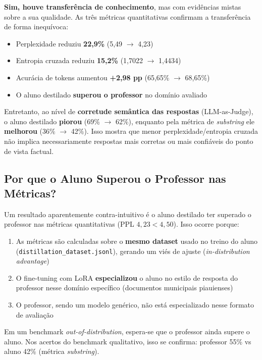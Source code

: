 \documentclass[12pt, a4paper]{article}
\begin{document}
\begin{destaquebox}
\textbf{Sim, houve transferência de conhecimento}, mas com evidências mistas sobre a
sua qualidade. As três métricas quantitativas confirmam a transferência de forma
inequívoca:
\begin{itemize}
  \item Perplexidade reduziu \textbf{22,9\%} (5,49 $\rightarrow$ 4,23)
  \item Entropia cruzada reduziu \textbf{15,2\%} (1,7022 $\rightarrow$ 1,4434)
  \item Acurácia de tokens aumentou \textbf{+2,98 pp} (65,65\% $\rightarrow$ 68,65\%)
  \item O aluno destilado \textbf{superou o professor} no domínio avaliado
\end{itemize}
Entretanto, ao nível de \textbf{corretude semântica das respostas} (LLM-as-Judge), o
aluno destilado \textbf{piorou} (69\% $\rightarrow$ 62\%), enquanto pela métrica de
\textit{substring} ele \textbf{melhorou} (36\% $\rightarrow$ 42\%). Isso mostra que
menor perplexidade/entropia cruzada não implica necessariamente respostas mais
corretas ou mais confiáveis do ponto de vista factual.
\end{destaquebox}

\subsection{Por que o Aluno Superou o Professor nas Métricas?}

Um resultado aparentemente contra-intuitivo é o aluno destilado ter superado o
professor nas métricas quantitativas (PPL $4{,}23 < 4{,}50$). Isso ocorre porque:

\begin{enumerate}
  \item As métricas são calculadas sobre o \textbf{mesmo dataset} usado no treino
        do aluno (\texttt{distillation\_dataset.jsonl}), gerando um viés de ajuste
        (\textit{in-distribution advantage})
  \item O fine-tuning com LoRA \textbf{especializou} o aluno no estilo de resposta
        do professor nesse domínio específico (documentos municipais piauienses)
  \item O professor, sendo um modelo genérico, não está especializado nesse formato
        de avaliação
\end{enumerate}

Em um benchmark \textit{out-of-distribution}, espera-se que o professor ainda
supere o aluno. Nos acertos do benchmark qualitativo, isso se confirma: professor 55\%
vs aluno 42\% (métrica \textit{substring}).
\end{document}
